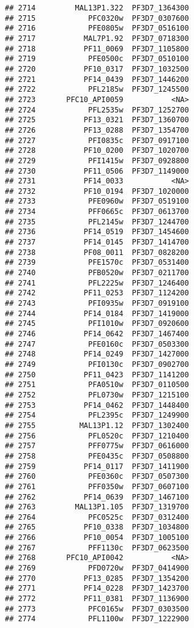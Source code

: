 \documentclass[12pt, a4paper]{article}\usepackage[]{graphicx}\usepackage[]{color}
\makeatletter
\newenvironment{kframe}{%
 \def\at@end@of@kframe{}%
 \ifinner\ifhmode%
  \def\at@end@of@kframe{\end{minipage}}%
  \begin{minipage}{\columnwidth}%
 \fi\fi%
 \def\FrameCommand##1{\hskip\@totalleftmargin \hskip-\fboxsep
 \colorbox{shadecolor}{##1}\hskip-\fboxsep
     \hskip-\linewidth \hskip-\@totalleftmargin \hskip\columnwidth}%
 \MakeFramed {\advance\hsize-\width
   \@totalleftmargin\z@ \linewidth\hsize
   \@setminipage}}%
 {\par\unskip\endMakeFramed%
 \at@end@of@kframe}
\newenvironment{knitrout}{}{} %
\makeatother
\begin{document}
\begin{knitrout}
\begin{kframe}
\begin{verbatim}
## 2714         MAL13P1.322  PF3D7_1364300
## 2715            PFC0320w  PF3D7_0307600
## 2716            PFE0805w  PF3D7_0516100
## 2717           MAL7P1.92  PF3D7_0718300
## 2718           PF11_0069  PF3D7_1105800
## 2719            PFE0500c  PF3D7_0510100
## 2720           PF10_0317  PF3D7_1032500
## 2721           PF14_0439  PF3D7_1446200
## 2722            PFL2185w  PF3D7_1245500
## 2723       PFC10_API0059           <NA>
## 2724            PFL2535w  PF3D7_1252700
## 2725           PF13_0321  PF3D7_1360700
## 2726           PF13_0288  PF3D7_1354700
## 2727            PFI0835c  PF3D7_0917100
## 2728           PF10_0200  PF3D7_1020700
## 2729            PFI1415w  PF3D7_0928800
## 2730           PF11_0506  PF3D7_1149000
## 2731           PF14_0033           <NA>
## 2732           PF10_0194  PF3D7_1020000
## 2733            PFE0960w  PF3D7_0519100
## 2734            PFF0665c  PF3D7_0613700
## 2735            PFL2145w  PF3D7_1244700
## 2736           PF14_0519  PF3D7_1454600
## 2737           PF14_0145  PF3D7_1414700
## 2738           PF08_0011  PF3D7_0828200
## 2739            PFE1570c  PF3D7_0531400
## 2740            PFB0520w  PF3D7_0211700
## 2741            PFL2225w  PF3D7_1246400
## 2742           PF11_0253  PF3D7_1124200
## 2743            PFI0935w  PF3D7_0919100
## 2744           PF14_0184  PF3D7_1419000
## 2745            PFI1010w  PF3D7_0920600
## 2746           PF14_0642  PF3D7_1467400
## 2747            PFE0160c  PF3D7_0503300
## 2748           PF14_0249  PF3D7_1427000
## 2749            PFI0130c  PF3D7_0902700
## 2750           PF11_0423  PF3D7_1141200
## 2751            PFA0510w  PF3D7_0110500
## 2752            PFL0730w  PF3D7_1215100
## 2753           PF14_0462  PF3D7_1448400
## 2754            PFL2395c  PF3D7_1249900
## 2755          MAL13P1.12  PF3D7_1302400
## 2756            PFL0520c  PF3D7_1210400
## 2757            PFF0775w  PF3D7_0616000
## 2758            PFE0435c  PF3D7_0508800
## 2759           PF14_0117  PF3D7_1411900
## 2760            PFE0360c  PF3D7_0507300
## 2761            PFF0350w  PF3D7_0607100
## 2762           PF14_0639  PF3D7_1467100
## 2763         MAL13P1.105  PF3D7_1319700
## 2764            PFC0525c  PF3D7_0312400
## 2765           PF10_0338  PF3D7_1034800
## 2766           PF10_0054  PF3D7_1005100
## 2767            PFF1130c  PF3D7_0623500
## 2768       PFC10_API0042           <NA>
## 2769            PFD0720w  PF3D7_0414900
## 2770           PF13_0285  PF3D7_1354200
## 2771           PF14_0228  PF3D7_1423700
## 2772           PF11_0381  PF3D7_1136900
## 2773            PFC0165w  PF3D7_0303500
## 2774            PFL1100w  PF3D7_1222900

\end{verbatim}
\end{kframe}
\end{knitrout}
\end{document}
